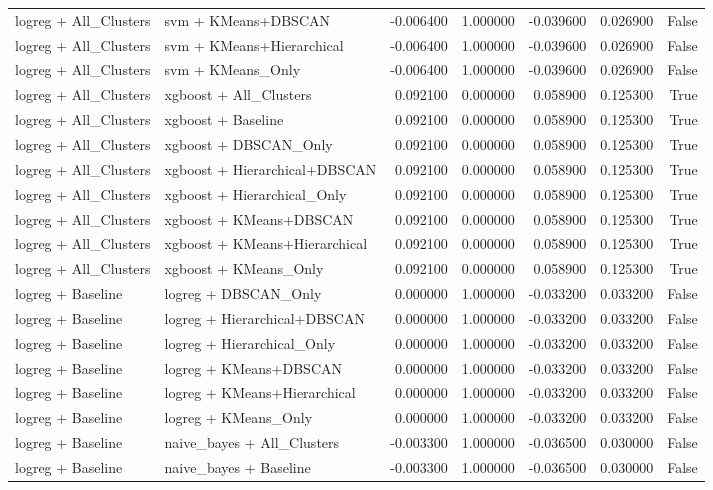 \begin{tabular}{llrrrrr}
logreg + All_Clusters & svm + KMeans+DBSCAN & -0.006400 & 1.000000 & -0.039600 & 0.026900 & False \\
logreg + All_Clusters & svm + KMeans+Hierarchical & -0.006400 & 1.000000 & -0.039600 & 0.026900 & False \\
logreg + All_Clusters & svm + KMeans_Only & -0.006400 & 1.000000 & -0.039600 & 0.026900 & False \\
logreg + All_Clusters & xgboost + All_Clusters & 0.092100 & 0.000000 & 0.058900 & 0.125300 & True \\
logreg + All_Clusters & xgboost + Baseline & 0.092100 & 0.000000 & 0.058900 & 0.125300 & True \\
logreg + All_Clusters & xgboost + DBSCAN_Only & 0.092100 & 0.000000 & 0.058900 & 0.125300 & True \\
logreg + All_Clusters & xgboost + Hierarchical+DBSCAN & 0.092100 & 0.000000 & 0.058900 & 0.125300 & True \\
logreg + All_Clusters & xgboost + Hierarchical_Only & 0.092100 & 0.000000 & 0.058900 & 0.125300 & True \\
logreg + All_Clusters & xgboost + KMeans+DBSCAN & 0.092100 & 0.000000 & 0.058900 & 0.125300 & True \\
logreg + All_Clusters & xgboost + KMeans+Hierarchical & 0.092100 & 0.000000 & 0.058900 & 0.125300 & True \\
logreg + All_Clusters & xgboost + KMeans_Only & 0.092100 & 0.000000 & 0.058900 & 0.125300 & True \\
logreg + Baseline & logreg + DBSCAN_Only & 0.000000 & 1.000000 & -0.033200 & 0.033200 & False \\
logreg + Baseline & logreg + Hierarchical+DBSCAN & 0.000000 & 1.000000 & -0.033200 & 0.033200 & False \\
logreg + Baseline & logreg + Hierarchical_Only & 0.000000 & 1.000000 & -0.033200 & 0.033200 & False \\
logreg + Baseline & logreg + KMeans+DBSCAN & 0.000000 & 1.000000 & -0.033200 & 0.033200 & False \\
logreg + Baseline & logreg + KMeans+Hierarchical & 0.000000 & 1.000000 & -0.033200 & 0.033200 & False \\
logreg + Baseline & logreg + KMeans_Only & 0.000000 & 1.000000 & -0.033200 & 0.033200 & False \\
logreg + Baseline & naive_bayes + All_Clusters & -0.003300 & 1.000000 & -0.036500 & 0.030000 & False \\
logreg + Baseline & naive_bayes + Baseline & -0.003300 & 1.000000 & -0.036500 & 0.030000 & False \\

\end{tabular}
